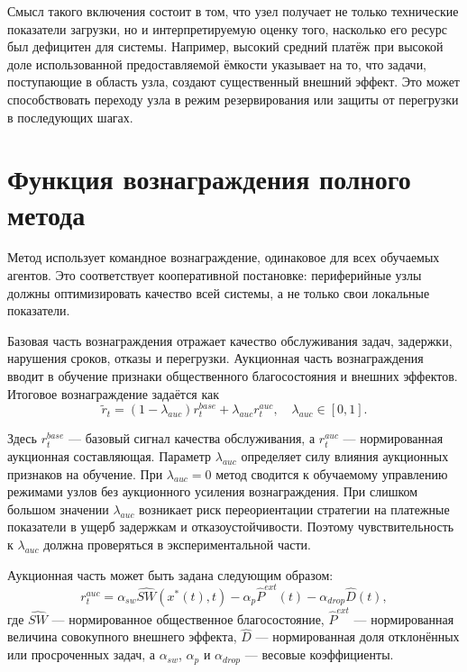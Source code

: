 Смысл такого включения состоит в том, что узел получает не только технические показатели загрузки, но и интерпретируемую оценку того, насколько его ресурс был дефицитен для системы. Например, высокий средний платёж при высокой доле использованной предоставляемой ёмкости указывает на то, что задачи, поступающие в область узла, создают существенный внешний эффект. Это может способствовать переходу узла в режим резервирования или защиты от перегрузки в последующих шагах.

\section{Функция вознаграждения полного метода}

Метод использует командное вознаграждение, одинаковое для всех обучаемых агентов. Это соответствует кооперативной постановке: периферийные узлы должны оптимизировать качество всей системы, а не только свои локальные показатели.

Базовая часть вознаграждения отражает качество обслуживания задач, задержки, нарушения сроков, отказы и перегрузки. Аукционная часть вознаграждения вводит в обучение признаки общественного благосостояния и внешних эффектов. Итоговое вознаграждение задаётся как
\begin{equation}
    \widetilde{r}_t = (1-\lambda_{auc}) r^{base}_t + \lambda_{auc} r^{auc}_t,
    \quad \lambda_{auc}\in[0,1].
    \label{eq:ch5_total_reward}
\end{equation}

Здесь $r^{base}_t$ --- базовый сигнал качества обслуживания, а $r^{auc}_t$ --- нормированная аукционная составляющая. Параметр $\lambda_{auc}$ определяет силу влияния аукционных признаков на обучение. При $\lambda_{auc}=0$ метод сводится к обучаемому управлению режимами узлов без аукционного усиления вознаграждения. При слишком большом значении $\lambda_{auc}$ возникает риск переориентации стратегии на платежные показатели в ущерб задержкам и отказоустойчивости. Поэтому чувствительность к $\lambda_{auc}$ должна проверяться в экспериментальной части.

Аукционная часть может быть задана следующим образом:
\begin{equation}
    r^{auc}_t = \alpha_{sw}\widehat{SW}(x^*(t),t)
    - \alpha_{p}\widehat{P}^{ext}(t)
    - \alpha_{drop}\widehat{D}(t),
    \label{eq:ch5_auction_reward}
\end{equation}
где $\widehat{SW}$ --- нормированное общественное благосостояние, $\widehat{P}^{ext}$ --- нормированная величина совокупного внешнего эффекта, $\widehat{D}$ --- нормированная доля отклонённых или просроченных задач, а $\alpha_{sw}$, $\alpha_{p}$ и $\alpha_{drop}$ --- весовые коэффициенты.

